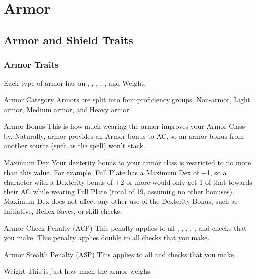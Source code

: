 \section{Armor}

\subsection{Armor and Shield Traits}

\subsubsection{Armor Traits}

Each type of armor has an , , , , , and Weight.

\begin{description*}
\item[Armor Category] Armors are split into four proficiency groups. Non-armor, Light armor, Medium armor, and Heavy armor.
\item[Armor Bonus] This is how much wearing the armor improves your Armor Class by. Naturally, armor provides an Armor bonus to AC, so an armor bonus from another source (such as the  spell) won't stack.
\item[Maximum Dex] Your dexterity bonus to your armor class is restricted to no more than this value. For example, Full Plate has a Maximum Dex of +1, so a character with a Dexterity bonus of +2 or more would only get 1 of that towards their AC while wearing Full Plate (total of 19, assuming no other bonuses). Maximum Dex does not affect any other use of the Dexterity Bonus, such as Initiative, Reflex Saves, or skill checks.
\item[Armor Check Penalty (ACP)] This penalty applies to all , , , , , and  checks that you make. This penalty applies double to all  checks that you make.
\item[Armor Stealth Penalty (ASP)] This applies to all  and  checks that you make.
\item[Weight] This is just how much the armor weighs.
\end{description*}


